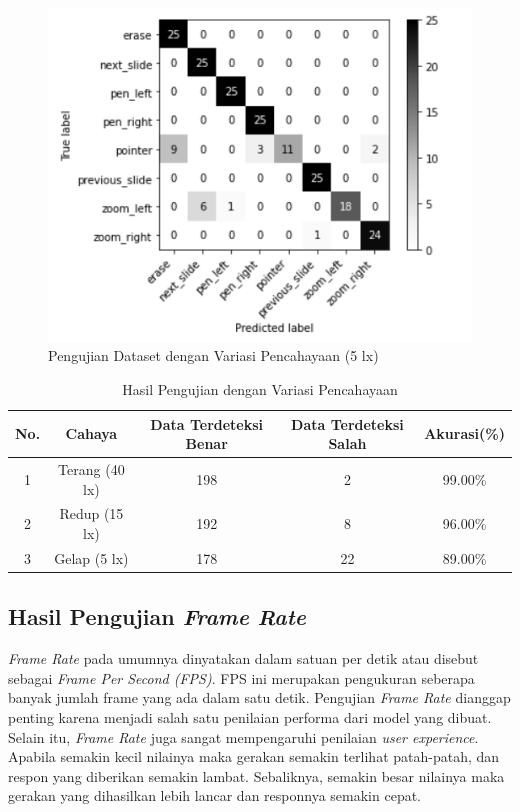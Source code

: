 \begin{figure}[!htb]
  \centering
  \includegraphics[scale=0.75]{gambar/pengujian-cahaya/5lux.png}
  \caption{Pengujian Dataset dengan Variasi Pencahayaan (5 lx)}
  \label{fig:Pengujian Dataset dengan Variasi Pencahayaan 5lux} 
\end{figure}

\begin{longtable}{|c|c|c|c|c|}
  \caption{Hasil Pengujian dengan Variasi Pencahayaan}
  \label{tb:Hasil Pengujian dengan Variasi Pencahayaan}\\
  \hline
  \rowcolor[HTML]{FFFFFF}
  \textbf{No.} & \textbf{Cahaya} & \textbf{Data Terdeteksi Benar} & \textbf{Data Terdeteksi Salah} & \textbf{Akurasi(\%)} \\
  \hline
  1 & Terang (40 lx)  & 198 & 2 & 99.00\%  \\
  2 & Redup (15 lx)   & 192 & 8 & 96.00\%  \\
  3 & Gelap (5 lx)    & 178 & 22 & 89.00\%  \\
  \hline
\end{longtable}

\subsection{Hasil Pengujian \emph{Frame Rate}}
\label{subsec:Hasil Pengujian Frame Rate}

\emph{Frame Rate} pada umumnya dinyatakan dalam satuan per detik atau disebut sebagai \emph{Frame Per Second (FPS)}. FPS ini merupakan pengukuran seberapa banyak jumlah frame yang ada dalam satu detik. Pengujian \emph{Frame Rate} dianggap penting karena menjadi salah satu penilaian performa dari model yang dibuat. Selain itu, \emph{Frame Rate} juga sangat mempengaruhi penilaian \emph{user experience}. Apabila semakin kecil nilainya maka gerakan semakin terlihat patah-patah, dan respon yang diberikan semakin lambat. Sebaliknya, semakin besar nilainya maka  gerakan yang dihasilkan lebih lancar dan responnya semakin cepat.

